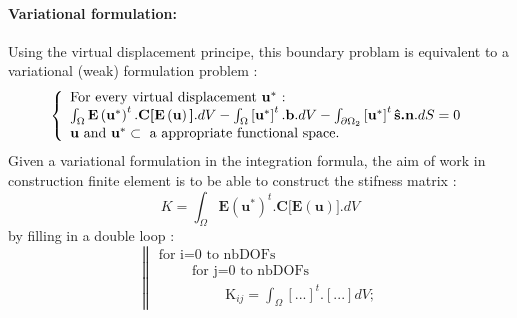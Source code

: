 \documentclass[a4paper,10pt]{article}
\begin{document}
\paragraph{Variational formulation: }
Using the virtual displacement principe, this boundary problam is equivalent to a variational (weak) formulation problem :
\[
\left\{
\begin{array}{l}
\text {For every virtual displacement \textbf{u}$^*$ :} \\
  \int_{\Omega}\textbf{E}\left(\textbf{u}^*\right) ^t .\textbf{C[E} \left( \textbf{u} \right) \textbf{]} .dV
 -\int_{\Omega}\left[\textbf{u}^*\right]^t . \textbf{b} .dV
 -\int_{\partial\Omega_2}\left[\textbf{u}^* \right]^t \textbf{\^{s}.n} .dS  =0 \\
                                      
 \textbf{u} \text{ and } \textbf{u}^*\subset \text{ a appropriate functional space.}
\end{array}\right.
\]
Given a variational formulation in the integration formula, the aim of work in construction finite element is to be able to construct the stifness matrix :
\[
 K=\int_{\Omega}\textbf{E}\left(\textbf{u}^*\right) ^t .\textbf{C[E} \left( \textbf{u} \right) \textbf{]} .dV
\]
by filling in a double loop :
\[
\left\|
\begin{array}{l}
\text{for i=0 to nbDOFs} \\ 
\hspace{1cm} \text{for j=0 to nbDOFs} \\
\hspace{2cm} \text{K}_{ij} = \int_{\Omega} [...]^t .[...]dV  ;
\end{array}
\right.
\]

\end{document}

